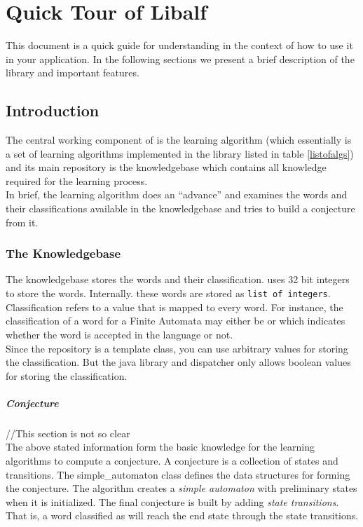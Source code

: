 \chapter{Quick Tour of Libalf}
This document is a quick guide for understanding \libalf in the context of how to use it in your application. In the following sections we present a brief description of the library and important features.

\section{Introduction}
The central working component of \libalf is the learning algorithm (which essentially is a set of learning algorithms implemented in the library listed in table \ref{listofalgs}) and its main repository is the knowledgebase which contains all knowledge required for the learning process. \\
In brief, the learning algorithm does an ``advance'' and examines the words and their classifications available in the knowledgebase and tries to build a conjecture from it. \\

\subsection{The Knowledgebase}
The knowledgebase stores the words and their classification. \libalf uses 32 bit integers to store the words. Internally. these words are stored as \texttt{list of integers}. \\
Classification refers to a value that is mapped to every word. For instance, the classification of a word for a Finite Automata may either be \true or \false which indicates whether the word is accepted in the language or not. \\
Since the repository is a template class, you can use arbitrary values for storing the classification. But the \jalf java library and dispatcher only allows boolean values for storing the classification. 
\paragraph{Conjecture} //This section is not so clear \\
The above stated information form the basic knowledge for the learning algorithms to compute a conjecture. A conjecture is a collection of states and transitions. The simple\_automaton class defines the data structures for forming the conjecture. The algorithm creates a \emph{simple automaton} with preliminary states when it is initialized. The final conjecture is built by adding \emph{state transitions}. That is, a word classified as \true will reach the end state through the state transitions. 

